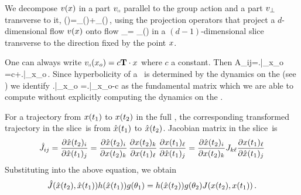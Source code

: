 We decompose $v(x)$
in a part $v_\shortparallel$ parallel to the group action and a part
$v_\perp$ transverse to it, \beq
	\vel(\ssp)=\vel_\shortparallel(\ssp)+\vel_\perp(\ssp)\,,
 using the projection operators that project a
$d$-dimensional flow $v(\ssp)$ onto flow \beq
	\dot{\ssp}_\perp = \vel_\perp(\ssp)
 in a $(d\!-\!1)$-dimensional {slice} transverse to
the direction fixed by the point $\ssp$.

One can always write $\vf_\shortparallel(x_o)=c\Lg \cdot x$ where $c$ a
constant.
Then \beq
	A_{ij}=\left.\right|_{x_o}
    =c\Lg+\left.\right|_{x_o}\,.
\eeq Since hyperbolicity of a \reqv\ is determined by the dynamics on the
{\csection} (see ) we identify \beq
	\left.\right|_{x_o}
   =\left.\right|_{x_o}-c\Lg
\eeq as the fundamental matrix which we are able to compute without
explicitly computing the dynamics on the {\csection}.

For a trajectory from $x(t_1)$ to $x(t_2)$ in the full
{\statesp}, the corresponding transformed trajectory in the  slice\ is
from $\hat{x}(t_1)$ to $\hat{x}(t_2)$. Jacobian matrix in the
slice\ is
\[\hat{J}_{ij}=\frac{\partial \hat{x}(t_2)_{i}}{\partial \hat{x}(t_1)_{j}}
=\frac{\partial \hat{x}(t_2)_{i}}{\partial x(t_2)_{k}}
\,
\frac{\partial x(t_2)_{k}}{\partial x(t_1)_{\ell}}
\,
\frac{\partial x(t_1)_{\ell}}{\partial \hat{x}(t_1)_{j}}
=\frac{\partial \hat{x}(t_2)_{i}}{\partial x(t_2)_{k}}
J_{k\ell}
\frac{\partial x(t_1)_{\ell}}{\partial \hat{x}(t_1)_{j}}
\]
Substituting  into the above equation, we
obtain
\begin{equation}
  \label{eq:relation_jacobian2}
  \hat{J}(\hat{x}(t_2),\hat{x}(t_1))h(\hat{x}(t_1))g(\theta_{1})=
h(\hat{x}(t_2))g(\theta_{2})J(x(t_2),x(t_1))
\,.
\end{equation}
